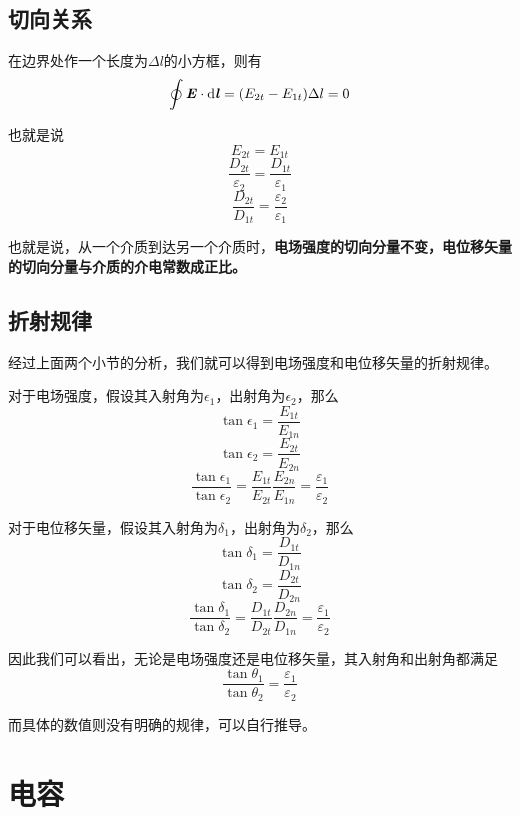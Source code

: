 \documentclass[UTF8,openany]{book}
\begin{document}
	\subsection{切向关系}
	\par 在边界处作一个长度为$\Delta l$的小方框，则有
	$$\oint\textbf{\textit{E}}\cdot\mathrm{d}\textbf{\textit{l}}=(E_{2t}-E_{1t})\Delta l=0$$
	\par 也就是说
	$$E_{2t}=E_{1t}$$
	$$\frac{D_{2t}}{\varepsilon_{2}}=\frac{D_{1t}}{\varepsilon_{1}}$$
	$$\frac{D_{2t}}{D_{1t}}=\frac{\varepsilon_{2}}{\varepsilon_{1}}$$
	\par 也就是说，从一个介质到达另一个介质时，\textbf{电场强度的切向分量不变，电位移矢量的切向分量与介质的介电常数成正比。}
	\subsection{折射规律}
	\par 经过上面两个小节的分析，我们就可以得到电场强度和电位移矢量的折射规律。
	\par 对于电场强度，假设其入射角为$\epsilon_{1}$，出射角为$\epsilon_{2}$，那么
	$$\tan\epsilon_{1}=\frac{E_{1t}}{E_{1n}}$$
	$$\tan\epsilon_{2}=\frac{E_{2t}}{E_{2n}}$$
	$$\frac{\tan\epsilon_{1}}{\tan\epsilon_{2}}=\frac{E_{1t}}{E_{2t}}\frac{E_{2n}}{E_{1n}}=\frac{\varepsilon_{1}}{\varepsilon_{2}}$$
	\par 对于电位移矢量，假设其入射角为$\delta_{1}$，出射角为$\delta_{2}$，那么
	$$\tan\delta_{1}=\frac{D_{1t}}{D_{1n}}$$
	$$\tan\delta_{2}=\frac{D_{2t}}{D_{2n}}$$
	$$\frac{\tan\delta_{1}}{\tan\delta_{2}}=\frac{D_{1t}}{D_{2t}}\frac{D_{2n}}{D_{1n}}=\frac{\varepsilon_{1}}{\varepsilon_{2}}$$
	\par 因此我们可以看出，无论是电场强度还是电位移矢量，其入射角和出射角都满足
	$$\frac{\tan\theta_1}{\tan\theta_2}=\frac{\varepsilon_{1}}{\varepsilon_{2}}$$
	\par 而具体的数值则没有明确的规律，可以自行推导。
	\section{电容}
\end{document}
